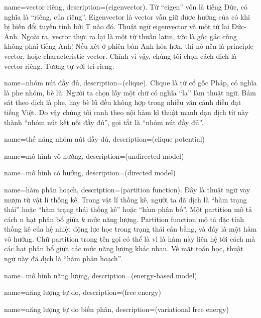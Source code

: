 {
    name={vector riêng},
    description={(eigenvector). Từ ``eigen'' vốn là tiếng Đức,
    có nghĩa là ``riêng, của riêng''. Eigenvector là vector
    vẫn giữ được hướng của có khi bị biến đổi tuyến tính bởi T
    nào đó. Thuật ngữ eigenvector và một từ lai Đức-Anh. Ngoài ra,
    vector thực ra lại là một từ thuần latin, tức là gốc gác
    cũng không phải tiếng Anh! Nếu xét ở phiên bản Anh hóa hơn,
    thì nó nên là principle-vector, hoặc characteristic-vector.
    Chính vì vậy, chúng tôi chọn cách dịch là vector riêng.
    Tương tự với \gls{tri-rieng}.}
}

{
    name={nhóm nút đầy đủ},
    description={(clique). Clique là từ cổ gốc Pháp, có nghĩa là phe nhóm,
    bè lũ. Người ta chọn lấy một chữ có nghĩa ``lạ'' làm thuật ngữ.
    Bám sát theo dịch là phe, hay bè lũ đều không hợp trong nhiều
    văn cảnh diễn đạt tiếng Việt. Do vậy chúng tôi canh
    theo nội hàm kĩ thuật mạnh dạn dịch từ này thành
    ``nhóm nút kết nối đầy đủ'', gọi tắt là ``nhóm nút đầy đủ''.}
}

{
    name={thế năng nhóm nút đầy đủ},
    description={(clique potential)}
}

{
    name={mô hình vô hướng},
    description={(undirected model)}
}

{
    name={mô hình có hướng},
    description={(directed model)}
}

{
    name={hàm phân hoạch},
    description={(partition function). Đây là thuật ngữ vay mượn
    từ vật lí thống kê. Trong vật lí thống kê, người ta đã dịch là
    ``hàm trạng thái'' hoặc ``hàm trạng thái thống kê'' hoặc
    ``hàm phân bố''. Một partition mô tả cách n hạt phân bổ giữa
    $k$ mức năng lượng. Partition function mô tả đặc tính thống kê
    của hệ nhiệt động lực học trong trạng thái cân bằng, và đây là
    một hàm vô hướng. Chữ partition trong tên gọi có thể là vì là
    hàm này liên hệ tới cách mà các hạt phân bổ giữa các mức năng
    lượng khác nhau. Về mặt toán học, thuật ngữ này đã dịch là
    ``hàm phân hoạch''.}
}

{
    name={mô hình năng lượng},
    description={(energy-based model)}
}

{
    name={năng lượng tự do},
    description={(free energy)}
}

{
    name={năng lượng tự do biến phân},
    description={(variational free energy)}
}


